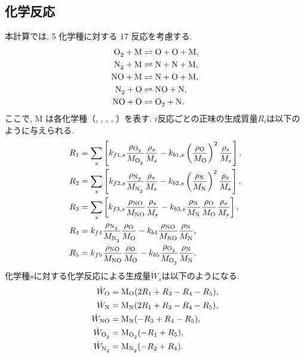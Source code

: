 \subsection*{化学反応}
本計算では,
5 化学種に対する 17 反応を考慮する.　
\begin{align}
    \ce{O2 + M &\rightleftharpoons O + O + M}, \\
    \ce{N2 + M &\rightleftharpoons N + N + M}, \\
    \ce{NO + M &\rightleftharpoons N + O + M}, \\
    \ce{N2 + O &\rightleftharpoons NO + N}, \\
    \ce{NO + O &\rightleftharpoons O2 + N}.
\end{align}
ここで,
M は各化学種（, , , , ）を表す.
$i$反応ごとの正味の生成質量$R_i$は以下のように与えられる.
\begin{align}
    R_1 &= \sum_{s} \left[ k_{f1,s} \dfrac{\rho_{\ce{O2}}}{M_{\ce{O2}}} \dfrac{\rho_s}{M_s} -k_{b1,s} \left( \dfrac{\rho_{\ce{O}}}{M_{\ce{O}}} \right) ^2 \dfrac{\rho_s}{M_s} \right],\\
    R_2 &= \sum_{s} \left[ k_{f2,s} \dfrac{\rho_{\ce{N2}}}{M_{\ce{N2}}} \dfrac{\rho_s}{M_s} -k_{b2,s} \left( \dfrac{\rho_{\ce{N}}}{M_{\ce{N}}} \right) ^2 \dfrac{\rho_s}{M_s} \right],\\
    R_3 &= \sum_{s} \left[ k_{f3,s} \dfrac{\rho_{\ce{NO}}}{M_{\ce{NO}}} \dfrac{\rho_s}{M_s} -k_{b3,s} \dfrac{\rho_{\ce{N}}}{M_{\ce{N}}} \dfrac{\rho_{\ce{O}}}{M_{\ce{O}}} \dfrac{\rho_s}{M_s} \right],\\
    R_4 &= k_{f4} \dfrac{\rho_{\ce{N2}}}{M_{\ce{N2}}} \dfrac{\rho_{\ce{O}}}{M_{\ce{O}}} -k_{b4} \dfrac{\rho_{\ce{NO}}}{M_{\ce{NO}}} \dfrac{\rho_{\ce{N}}}{M_{\ce{N}}},\\
    R_5 &= k_{f5} \dfrac{\rho_{\ce{NO}}}{M_{\ce{NO}}} \dfrac{\rho_{\ce{O}}}{M_{\ce{O}}} -k_{b5} \dfrac{\rho_{\ce{O2}}}{M_{\ce{O2}}} \dfrac{\rho_{\ce{N}}}{M_{\ce{N}}}.
\end{align}
化学種$s$に対する化学反応による生成量${\dot W}_s$は以下のようになる.
\begin{align}
{\dot W}_{\ce{O}}  &= \ce{M}_{\ce{O}}(2R_1+R_3-R_4-R_5),\\
{\dot W}_{\ce{N}}  &= \ce{M}_{\ce{N}}(2R_1+R_3-R_4-R_5),\\
{\dot W}_{\ce{NO}} &= \ce{M}_{\ce{N}}(-R_3+R_4-R_5),\\
{\dot W}_{\ce{O2}} &= \ce{M}_{\ce{O2}}(-R_1+R_5),\\
{\dot W}_{\ce{N2}} &= \ce{M}_{\ce{N2}}(-R_2+R_4).
\end{align}
